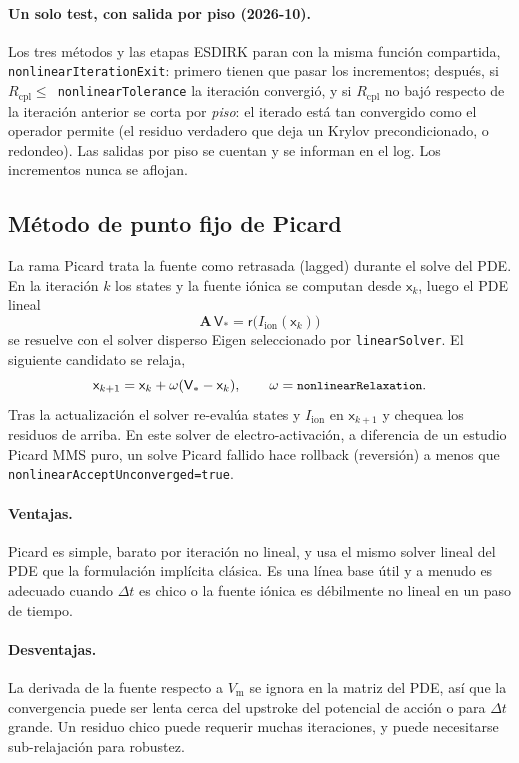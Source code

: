 \documentclass[11pt,a4paper]{article}
\newcommand{\code}[1]{\texttt{\small #1}}
\newcommand{\Vm}{V_{\text{m}}}
\newcommand{\Iion}{I_{\mathrm{ion}}}
\newcommand{\Aimp}{\mathbf{A}}
\begin{document}
\paragraph{Un solo test, con salida por piso (2026-10).} Los tres métodos y las
etapas ESDIRK paran con la misma función compartida,
\code{nonlinearIterationExit}: primero tienen que pasar los incrementos; después,
si $R_{\mathrm{cpl}}\le$~\code{nonlinearTolerance} la iteración convergió, y si
$R_{\mathrm{cpl}}$ no bajó respecto de la iteración anterior se corta por
\emph{piso}: el iterado está tan convergido como el operador permite (el residuo
verdadero que deja un Krylov precondicionado, o redondeo). Las salidas por piso se
cuentan y se informan en el log. Los incrementos nunca se aflojan.

\subsection{Método de punto fijo de Picard}

La rama Picard trata la fuente como retrasada (lagged) durante el solve del PDE. En
la iteración $k$ los states y la fuente iónica se computan desde $\mathsf{x}_k$,
luego el PDE lineal
\begin{equation}
  \Aimp\,\mathsf{V}_{*}
  =
  \mathsf{r}\!\bigl(\Iion(\mathsf{x}_{k})\bigr)
\end{equation}
se resuelve con el solver disperso Eigen seleccionado por \code{linearSolver}. El
siguiente candidato se relaja,
\begin{equation}
  \mathsf{x}_{k+1}
  =
  \mathsf{x}_{k}
  + \omega(\mathsf{V}_{*}-\mathsf{x}_{k}),
  \qquad
  \omega=\code{nonlinearRelaxation}.
\end{equation}
Tras la actualización el solver re-evalúa states y $\Iion$ en $\mathsf{x}_{k+1}$ y
chequea los residuos de arriba. En este solver de electro-activación, a diferencia
de un estudio Picard MMS puro, un solve Picard fallido hace rollback (reversión) a
menos que \code{nonlinearAcceptUnconverged=true}.

\paragraph{Ventajas.}
Picard es simple, barato por iteración no lineal, y usa el mismo solver lineal del
PDE que la formulación implícita clásica. Es una línea base útil y a menudo es
adecuado cuando $\Delta t$ es chico o la fuente iónica es débilmente no lineal en un
paso de tiempo.

\paragraph{Desventajas.}
La derivada de la fuente respecto a $\Vm$ se ignora en la matriz del PDE, así que la
convergencia puede ser lenta cerca del upstroke del potencial de acción o para
$\Delta t$ grande. Un residuo chico puede requerir muchas iteraciones, y puede
necesitarse sub-relajación para robustez.
\end{document}
